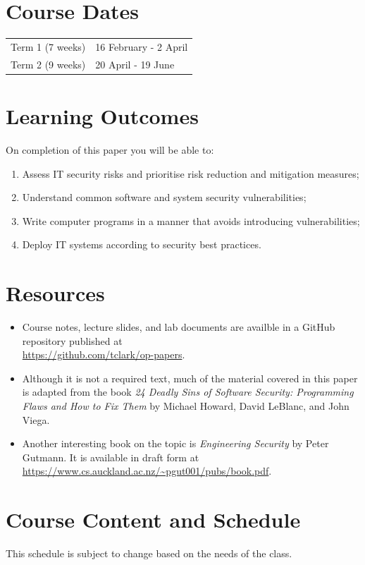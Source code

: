\documentclass{article}
\begin{document}
\section*{Course Dates}
\begin{tabular}{ll}
Term 1 (7 weeks) & 16 February - 2 April\\
Term 2 (9 weeks) & 20 April - 19 June\\
\end{tabular}

\newpage 

\section*{Learning Outcomes}
On completion of this paper you will be able to:
\begin{enumerate}
  \item Assess IT security risks and prioritise risk reduction and
	  mitigation measures;
  \item Understand common software and system security vulnerabilities;
  \item Write computer programs in a manner that avoids introducing 
	  vulnerabilities;
  \item Deploy IT systems according to security best practices.
\end{enumerate}

\section*{Resources}
\begin{itemize}
	\item Course notes, lecture slides, and lab documents are availble in a GitHub 
		repository published at \\ \url{https://github.com/tclark/op-papers}.
	\item Although it is not a required text, much of the material covered in this paper is 
		adapted from the book \emph{24 Deadly Sins of Software Security: Programming Flaws and 
		How to Fix Them} by Michael Howard, David LeBlanc, and John Viega.
	\item Another interesting book on the topic is \emph{Engineering Security} by Peter Gutmann.
		It is available in draft form at 
		\url{https://www.cs.auckland.ac.nz/~pgut001/pubs/book.pdf}.
\end{itemize}


\section*{Course Content and Schedule}
This schedule is subject to change based on the needs of the class.
\end{document}
